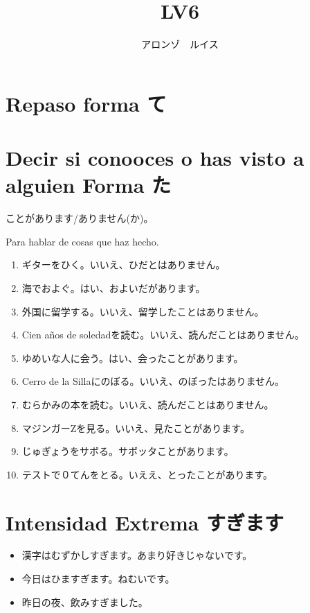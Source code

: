 \documentclass[a4paper,lualatex,ja=standard,base=10pt]{bxjsarticle}
\title{\ruby{第|１３|課}{だい||か} LV6}
\author{アロンゾ　ルイス}
\begin{document}
\setcounter{page}{1}

\maketitle{}
\thispagestyle{fancy}

\section{Repaso forma て}

\section{Decir si conooces o has visto a alguien Forma た}

ことがあります/ありません(か)。

Para hablar de cosas que haz hecho.

\begin{enumerate}
  \item ギターをひく。いいえ、ひだとはありません。
  \item 海でおよぐ。はい、およいだがあります。
  \item 外国に留学する。いいえ、留学したことはありません。
  \item Cien años de soledadを読む。いいえ、読んだことはありません。
  \item ゆめいな人に会う。はい、会ったことがあります。
  \item Cerro de la Sillaにのぼる。いいえ、のぼったはありません。
  \item むらかみの本を読む。いいえ、読んだことはありません。
  \item マジンガーZを見る。いいえ、見たことがあります。
  \item じゅぎょうをサボる。サボッタことがあります。
  \item テストで０てんをとる。いええ、とったことがあります。
\end{enumerate}

\section{Intensidad Extrema すぎます}

\begin{itemize}
  \item 漢字はむずかしすぎます。あまり好きじゃないです。
  \item 今日はひますぎます。ねむいです。
  \item 昨日の夜、飲みすぎました。
\end{itemize}
\end{document}

